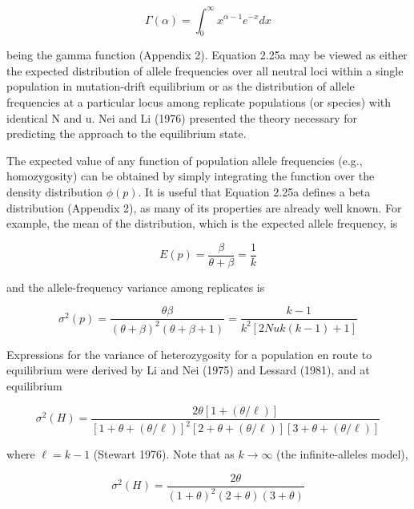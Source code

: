 \documentclass{article}
\begin{document}
\begin{equation}
\Gamma(\alpha)=\int_{0}^{\infty}x^{\alpha-1}e^{-x}d x
\tag{2.25b}
\label{eq:2_25b}
\end{equation}

being the gamma function (Appendix 2). Equation 2.25a may be viewed as either the expected distribution of allele frequencies over all neutral loci within a single population in mutation-drift equilibrium or as the distribution of allele frequencies at a particular locus among replicate populations (or species) with identical N and u. Nei and Li (1976) presented the theory necessary for predicting the approach to the equilibrium state.

The expected value of any function of population allele frequencies (e.g., homozygosity) can be obtained by simply integrating the function over the density distribution  $ \phi(p) $. It is useful that Equation 2.25a defines a beta distribution (Appendix 2), as many of its properties are already well known. For example, the mean of the distribution, which is the expected allele frequency, is

\begin{equation}
E(p)=\frac{\beta}{\theta+\beta}=\frac{1}{k}
\tag{2.26a}
\label{eq:2_26a}
\end{equation}

and the allele-frequency variance among replicates is

\begin{equation}
\sigma^{2}(p)=\frac{\theta\beta}{(\theta+\beta)^{2}(\theta+\beta+1)}=\frac{k-1}{k^{2}[2N u k(k-1)+1]}
\tag{2.26b}
\label{eq:2_26b}
\end{equation}

Expressions for the variance of heterozygosity for a population en route to equilibrium were derived by Li and Nei (1975) and Lessard (1981), and at equilibrium

\begin{equation}
\sigma^{2}(H)=\frac{2\theta[1+(\theta/\ell)]}{[1+\theta+(\theta/\ell)]^{2}[2+\theta+(\theta/\ell)][3+\theta+(\theta/\ell)]}
\tag{2.27a}
\label{eq:2_27a}
\end{equation}

where  $ \ell = k - 1 $ (Stewart 1976). Note that as  $ k \to \infty $ (the infinite-alleles model),

\begin{equation}
\sigma^{2}(H)=\frac{2\theta}{(1+\theta)^{2}(2+\theta)(3+\theta)}
\tag{2.27b}
\label{eq:2_27b}
\end{equation}
\end{document}
